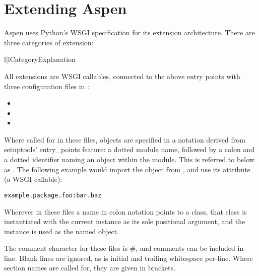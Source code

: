 \chapter{Extending Aspen}

Aspen uses Python's WSGI specification for its extension architecture. There are
three categories of extension:

\begin{tableii}{l|l}{}{Category}{Explanation}
\end{tableii}

All extensions are WSGI callables, connected to the above entry points with
three configuration files in :

\begin{itemize}
\item{}
\item{}
\item{}
\end{itemize}

Where called for in these files, objects are specified in a notation derived
from setuptools' entry_points feature: a dotted module name, followed by a colon
and a dotted identifier naming an object within the module. This is referred to
below as . The following example would import the 
object from , and use its  attribute (a WSGI
callable):

\begin{verbatim}
example.package.foo:bar.baz
\end{verbatim}

Wherever in these files a name in colon notation points to a class, that class
is instantiated with the current  instance as its sole positional
argument, and the instance is used as the named object.

The comment character for these files is \#, and comments can be included
in-line. Blank lines are ignored, as is initial and trailing whitespace
per-line. Where section names are called for, they are given in brackets.



